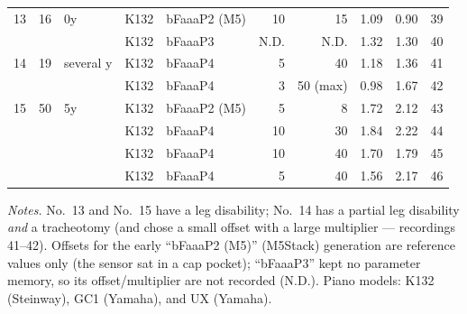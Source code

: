 \begin{longtable}{@{}r l l l l r r r r r@{}}
13 & 16 & 0y & K132 & bFaaaP2 (M5) & 10 & 15 & 1.09 & 0.90 & 39 \\
   &    &    & K132 & bFaaaP3 & N.D. & N.D. & 1.32 & 1.30 & 40 \\
14 & 19 & several y & K132 & bFaaaP4 & 5 & 40 & 1.18 & 1.36 & 41 \\
   &    &          & K132 & bFaaaP4 & 3 & 50 (max) & 0.98 & 1.67 & 42 \\
15 & 50 & 5y & K132 & bFaaaP2 (M5) & 5 & 8 & 1.72 & 2.12 & 43 \\
   &    &    & K132 & bFaaaP4 & 10 & 30 & 1.84 & 2.22 & 44 \\
   &    &    & K132 & bFaaaP4 & 10 & 40 & 1.70 & 1.79 & 45 \\
   &    &    & K132 & bFaaaP4 & 5 & 40 & 1.56 & 2.17 & 46 \\
\end{longtable}
\normalsize

\noindent\emph{Notes.} No.~13 and No.~15 have a leg disability; No.~14 has a
partial leg disability \emph{and} a tracheotomy (and chose a small offset with a
large multiplier --- recordings 41--42). Offsets for the early ``bFaaaP2 (M5)''
(M5Stack) generation are reference values only (the sensor sat in a cap pocket);
``bFaaaP3'' kept no parameter memory, so its offset/multiplier are not recorded
(N.D.). Piano models: K132 (Steinway), GC1 (Yamaha), and UX (Yamaha).
